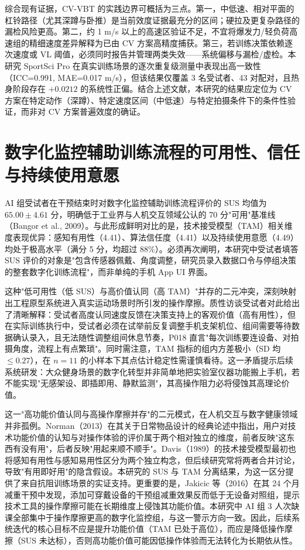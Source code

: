 \documentclass[UTF8,zihao=-4,twoside,openany]{ctexbook}
\begin{document}
综合现有证据，CV-VBT 的实践边界可概括为三点。第一，中低速、相对平面的杠铃路径（尤其深蹲与卧推）是当前效度证据最充分的区间；硬拉及更复杂路径的漏检风险更高。第二，约 1 m/s 以上的高速区验证不足，不宜将爆发力/轻负荷高速组的精细速度差异解释为已由 CV 方案高精度捕获。第三，若训练决策依赖逐次速度或 VL 阈值，必须同时报告并管理两类失效——系统偏移与漏检/虚检。本研究 SportSci Pro 在真实训练场景的逐次重复级测量中表现出高一致性（ICC=0.991, MAE=0.017 m/s），但该结果仅覆盖 3 名受试者、43 对配对，且热身阶段存在 $+0.0212$ 的系统性正偏。结合上述文献，本研究的结果应定位为 CV 方案在特定动作（深蹲）、特定速度区间（中低速）与特定拍摄条件下的条件性验证，而非对 CV 方案普遍效度的确证。

\section{数字化监控辅助训练流程的可用性、信任与持续使用意愿}
AI 组受试者在干预结束时对数字化监控辅助训练流程评价的 SUS 均值为 $65.00 \pm 4.61$ 分，明确低于工业界与人机交互领域公认的 70 分"可用"基准线（Bangor et al., 2009）。与此形成鲜明对比的是，技术接受模型（TAM）相关维度表现优异：感知有用性（4.41）、算法信任度（4.41）以及持续使用意愿（4.49）均处于极高水平（满分 5 分，均超过 88\%）。必须再次阐明，本研究中受试者填答 SUS 评价的对象是"包含传感器佩戴、角度调整，研究员录入数据口令与停组决策的整套数字化训练流程"，而非单纯的手机 App UI 界面。

这种"低可用性（低 SUS）与高价值认同（高 TAM）"并存的二元冲突，深刻映射出工程原型系统进入真实运动场景时所引发的操作摩擦。质性访谈受试者对此给出了清晰解释：受试者高度认同速度反馈在决策支持上的客观价值（高有用性），但在实际训练执行中，受试者必须在试举前反复调整手机支架机位、组间需要等待数据确认录入，且无法随性调整组间休息节奏，P018 直言"每次训练要连设备、对拍摄角度，流程上有点繁琐"。同时需注意，TAM 指标的组内方差极小（SD 均 $\le 0.27$），在 $n=11$ 的小样本下其点估计稳定性需谨慎看待。这一矛盾提示后续系统研发：大众健身场景的数字化转型并非简单地把实验室仪器功能搬上手机，若不能实现"无感架设、即插即用、静默监测"，其高操作阻力必将侵蚀其高理论价值。

这一"高功能价值认同与高操作摩擦并存"的二元模式，在人机交互与数字健康领域并非孤例。Norman（2013）在其关于日常物品设计的经典论述中指出，用户对技术功能价值的认知与对操作体验的评价属于两个相对独立的维度，前者反映"这东西有没有用"，后者反映"用起来顺不顺手"。Davis（1989）的技术接受模型最初也将感知有用性与感知易用性区分为两个独立构念，但后续研究常将两者合并讨论，导致"有用即好用"的隐含假设。本研究的 SUS 与 TAM 分离结果，为这一区分提供了来自抗阻训练场景的实证支持。更重要的是，Jakicic 等（2016）在其 24 个月减重干预中发现，添加可穿戴设备的干预组减重效果反而低于无设备对照组，提示技术工具的操作摩擦可能在长期维度上侵蚀其功能价值。本研究中 AI 组 3 人次缺课全部集中于操作摩擦更高的数字化监控组，与这一警示方向一致。因此，后续系统迭代的核心目标不应是提升功能价值（TAM 已处于高位），而应是降低操作摩擦（SUS 未达标），否则高功能价值可能因低操作体验而无法转化为长期依从性。
\end{document}
